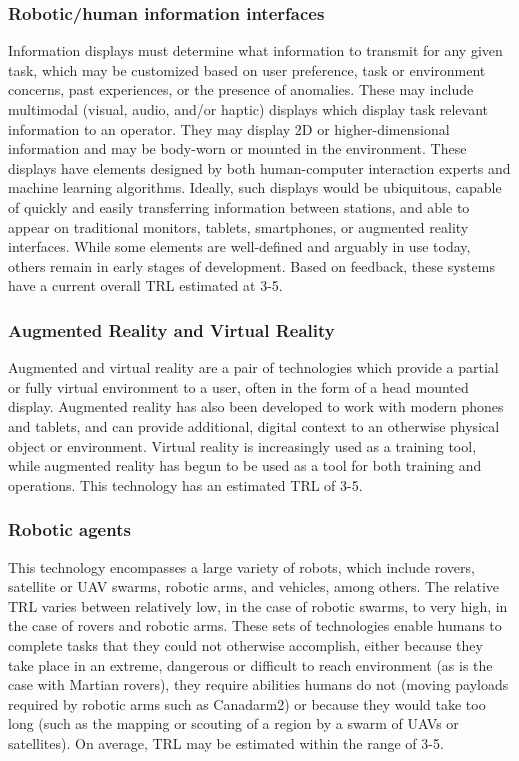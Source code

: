 \subsubsection{Robotic/human information interfaces}
Information displays must determine what information to transmit for any given task, which may be customized based on user preference, task or environment concerns, past experiences, or the presence of anomalies. These may include multimodal (visual, audio, and/or haptic) displays which display task relevant information to an operator. They may display 2D or higher-dimensional information and may be body-worn or mounted in the environment. These displays have elements designed by both human-computer interaction experts and machine learning algorithms. Ideally, such displays would be ubiquitous, capable of quickly and easily transferring information between stations, and able to appear on traditional monitors, tablets, smartphones, or augmented reality interfaces. While some elements are well-defined and arguably in use today, others remain in early stages of development. Based on feedback, these systems have a current overall TRL estimated at 3-5.

\subsubsection{Augmented Reality and Virtual Reality}
Augmented and virtual reality are a pair of technologies which provide a partial or fully virtual environment to a user, often in the form of a head mounted display. Augmented reality has also been developed to work with modern phones and tablets, and can provide additional, digital context to an otherwise physical object or environment. Virtual reality is increasingly used as a training tool, while augmented reality has begun to be used as a tool for both training and operations. This technology has an estimated TRL of 3-5.

\subsubsection{Robotic agents}
This technology encompasses a large variety of robots, which include rovers, satellite or UAV swarms, robotic arms, and vehicles, among others. The relative TRL varies between relatively low, in the case of robotic swarms, to very high, in the case of rovers and robotic arms. These sets of technologies enable humans to complete tasks that they could not otherwise accomplish, either because they take place in an extreme, dangerous or difficult to reach environment (as is the case with Martian rovers), they require abilities humans do not (moving payloads required by robotic arms such as Canadarm2) or because they would take too long (such as the mapping or scouting of a region by a swarm of UAVs or satellites). On average, TRL may be estimated within the range of 3-5.

